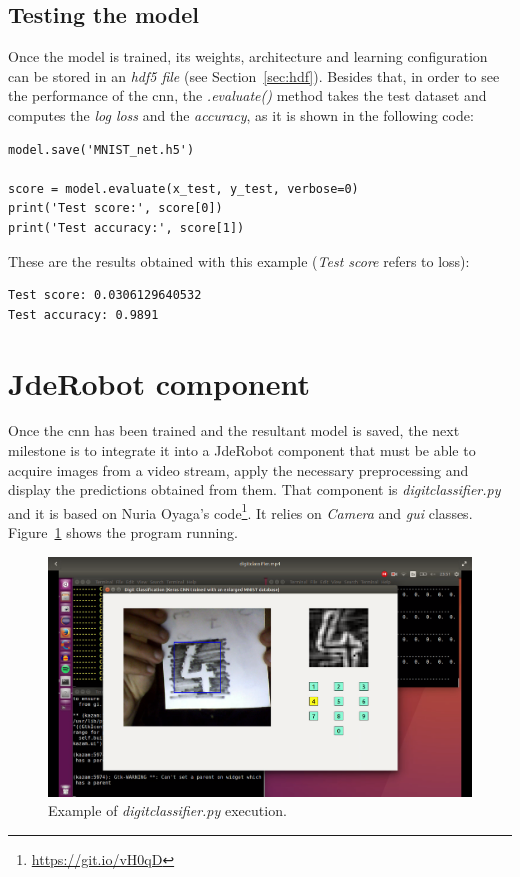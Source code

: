 \subsection{Testing the model}
Once the model is trained, its weights, architecture and learning configuration can be stored in an \emph{\gls{hdf5} file} (see Section~\ref{sec:hdf}). Besides that, in order to see the performance of the \gls{cnn}, the \textit{.evaluate()} method takes the test dataset and computes the \emph{log loss} and the \emph{accuracy}, as it is shown in the following code:
\begin{lstlisting}
model.save('MNIST_net.h5')

score = model.evaluate(x_test, y_test, verbose=0)
print('Test score:', score[0])
print('Test accuracy:', score[1])
\end{lstlisting}
These are the results obtained with this example (\textit{Test score} refers to loss):
\begin{Verbatim}[frame=single]
Test score: 0.0306129640532
Test accuracy: 0.9891
\end{Verbatim}

\section{JdeRobot component}\label{sec:component}
Once the \gls{cnn} has been trained and the resultant model is saved, the next milestone is to integrate it into a JdeRobot component that must be able to acquire images from a video stream, apply the necessary preprocessing and display the predictions obtained from them. That component is \emph{\textit{digitclassifier.py}} and it is based on Nuria Oyaga's code\footnote{\url{https://git.io/vH0qD}}. It relies on \textit{Camera} and \textit{\gls{gui}} classes. Figure~\ref{fig:digitclass} shows the program running.

\begin{figure}
	\centering
	\includegraphics[width=1\linewidth, keepaspectratio]{figures/digitclass.png}
	\caption{Example of \textit{digitclassifier.py} execution.}
	\label{fig:digitclass}
\end{figure}

